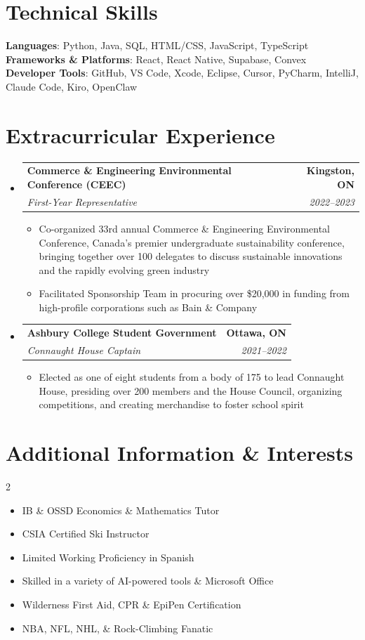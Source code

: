 \documentclass[letterpaper,10pt]{article}
\makeatletter
\newcommand{\resumeItem}[1]{
  \item\small{
    {#1 \vspace{-2pt}}
  }
}
\newcommand{\resumeSubheading}[4]{
  \vspace{-2pt}\item
    \begin{tabular*}{1.0\textwidth}[t]{l@{\extracolsep{\fill}}r}
      \textbf{#1} & \textbf{\small #2} \\
      \textit{\small#3} & \textit{\small #4} \\
    \end{tabular*}\vspace{-7pt}
}
\newcommand{\resumeSubHeadingListStart}{\begin{itemize}[leftmargin=0.0in, label={}]}
\newcommand{\resumeSubHeadingListEnd}{\end{itemize}}
\newcommand{\resumeItemListStart}{\begin{itemize}[label=--]}
\newcommand{\resumeItemListEnd}{\end{itemize}\vspace{-5pt}}
\makeatother
\begin{document}
%
\section{Technical Skills}
 \begin{itemize}[leftmargin=0.15in, label={}]
    \small{\item{
     \textbf{Languages}{: Python, Java, SQL, HTML/CSS, JavaScript, TypeScript} \\
     \textbf{Frameworks \& Platforms}{: React, React Native, Supabase, Convex} \\
     \textbf{Developer Tools}{: GitHub, VS Code, Xcode, Eclipse, Cursor, PyCharm, IntelliJ, Claude Code, Kiro, OpenClaw} \\
    }}
 \end{itemize}
 \vspace{-16pt}

\section{Extracurricular Experience}
    \resumeSubHeadingListStart
      \resumeSubheading
        {Commerce \& Engineering Environmental Conference (CEEC)}{Kingston, ON}
        {First-Year Representative}{2022--2023}
        \resumeItemListStart
            \resumeItem{Co-organized 33rd annual Commerce \& Engineering Environmental Conference, Canada's premier undergraduate sustainability conference, bringing together over 100 delegates to discuss sustainable innovations and the rapidly evolving green industry}
            \resumeItem{Facilitated Sponsorship Team in procuring over \$20,000 in funding from high-profile corporations such as Bain \& Company}
        \resumeItemListEnd
      \resumeSubheading
        {Ashbury College Student Government}{Ottawa, ON}
        {Connaught House Captain}{2021--2022}
        \resumeItemListStart
            \resumeItem{Elected as one of eight students from a body of 175 to lead Connaught House, presiding over 200 members and the House Council, organizing competitions, and creating merchandise to foster school spirit}
        \resumeItemListEnd
    \resumeSubHeadingListEnd

\section{Additional Information \& Interests}
    \begin{multicols}{2}
        \begin{itemize}[label=--, topsep=0pt, itemsep=0pt, parsep=0pt, partopsep=0pt, leftmargin=*]
            \resumeItem{IB \& OSSD Economics \& Mathematics Tutor}
            \resumeItem{CSIA Certified Ski Instructor}
            \resumeItem{Limited Working Proficiency in Spanish}
            \resumeItem{Skilled in a variety of AI-powered tools \& Microsoft Office}
            \resumeItem{Wilderness First Aid, CPR \& EpiPen Certification}
            \resumeItem{NBA, NFL, NHL, \& Rock-Climbing Fanatic}
        \end{itemize}
    \end{multicols}
\end{document}
